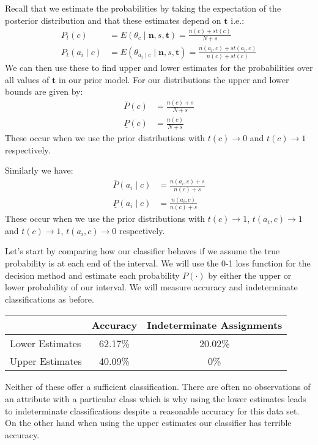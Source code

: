 Recall that we estimate the probabilities by taking the expectation of the posterior distribution and that these estimates depend on $\mathbf{t}$ i.e.:
\begin{align}
	P_t(c) & = E(\theta_c \mid \mathbf{n},s,\mathbf{t}) = \frac{n(c) + st(c)}{N + s} \\
	P_t(a_i \mid c) & = E(\theta_{a_i \mid c} \mid \mathbf{n},s,\mathbf{t}) = \frac{n(a_i, c) + st(a_i, c)}{n(c) + st(c)}
\end{align}
We can then use these to find upper and lower estimates for the probabilities over all values of $\mathbf{t}$ in our prior model.
For our distributions the upper and lower bounds are given by:
\begin{align}
	\overline{P}(c) & = \frac{n(c) + s}{N+s} \\
	\underline{P}(c) & = \frac{n(c)}{N+s}
\end{align}
These occur when we use the prior distributions with $t(c) \rightarrow 0$ and $t(c) \rightarrow 1$ respectively.

Similarly we have:
\begin{align}
	\overline{P}(a_i \mid c) & = \frac{n(a_i, c) + s}{n(c)+s} \\
	\underline{P}(a_i \mid c) & = \frac{n(a_i, c)}{n(c)+s}
\end{align}
These occur when we use the prior distributions with $t(c) \rightarrow 1$, $t(a_i, c)\rightarrow1$ and $t(c) \rightarrow 1$, $t(a_i, c)\rightarrow0$ respectively.

Let's start by comparing how our classifier behaves if we assume the true probability is at each end of the interval.
We will use the 0-1 loss function for the decision method and estimate each probability $P(\cdot)$ by either the upper or lower probability of our interval.
We will measure accuracy and indeterminate classifications as before.

\begin{center}
	\begin{tabular}{l|c c}
	                & Accuracy & Indeterminate Assignments \\
	\hline
	Lower Estimates & 62.17\%  & 20.02\%            \\
	Upper Estimates & 40.09\%  & 0\%                \\
	\end{tabular}
\end{center}

Neither of these offer a sufficient classification.
There are often no observations of an attribute with a particular class which is why using the lower estimates leads to indeterminate classifications despite a reasonable accuracy for this data set.
On the other hand when using the upper estimates our classifier has terrible accuracy.

